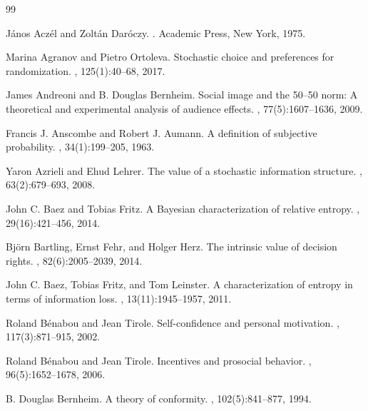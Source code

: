 \documentclass[11pt,a4paper]{article}
\theoremstyle{definition}
\newcommand{\1}{\mathbf 1}
\begin{document}
\clearpage
\begin{thebibliography}{99}
\raggedright

J\'anos Acz\'el and Zolt\'an Dar\'oczy.
.
\newblock Academic Press, New York, 1975.

Marina Agranov and Pietro Ortoleva.
\newblock Stochastic choice and preferences for randomization.
, 125(1):40--68, 2017.

James Andreoni and B. Douglas Bernheim.
\newblock Social image and the 50--50 norm: A theoretical and experimental analysis of audience effects.
, 77(5):1607--1636, 2009.

Francis J. Anscombe and Robert J. Aumann.
\newblock A definition of subjective probability.
, 34(1):199--205, 1963.

Yaron Azrieli and Ehud Lehrer.
\newblock The value of a stochastic information structure.
, 63(2):679--693, 2008.

John C. Baez and Tobias Fritz.
\newblock A {B}ayesian characterization of relative entropy.
, 29(16):421--456, 2014.

Bj\"orn Bartling, Ernst Fehr, and Holger Herz.
\newblock The intrinsic value of decision rights.
, 82(6):2005--2039, 2014.

John C. Baez, Tobias Fritz, and Tom Leinster.
\newblock A characterization of entropy in terms of information loss.
, 13(11):1945--1957, 2011.

Roland B\'enabou and Jean Tirole.
\newblock Self-confidence and personal motivation.
, 117(3):871--915, 2002.

Roland B\'enabou and Jean Tirole.
\newblock Incentives and prosocial behavior.
, 96(5):1652--1678, 2006.

B. Douglas Bernheim.
\newblock A theory of conformity.
, 102(5):841--877, 1994.


\end{thebibliography}
\end{document}
